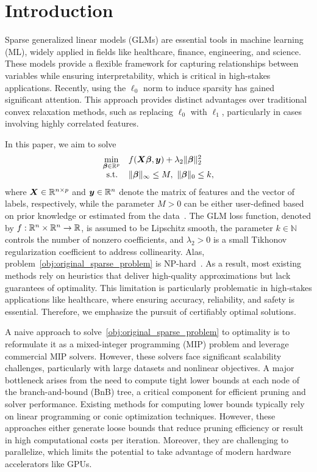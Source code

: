 \section{Introduction}

Sparse generalized linear models (GLMs) are essential tools in machine learning (ML), widely applied in fields like healthcare, finance, engineering, and science. 
These models provide a flexible framework for capturing relationships between variables while ensuring interpretability, which is critical in high-stakes applications.
Recently, using the $\ell_0$ norm to induce sparsity has gained significant attention. This approach provides distinct advantages over traditional convex relaxation methods, such as replacing $\ell_0$ with $\ell_1$, particularly in cases involving highly correlated features.

In this paper, we aim to solve
\begin{align} \label{obj:original_sparse_problem}
    \begin{array}{cl}
        \min\limits_{\bm{\beta} \in \mathbb{R}^p} & f(\bm{X} \bm{\beta}, \bm{y}) + \lambda_2 \lVert \bm{\beta} \rVert_2^2 \\
        \operatorname{s.\!t.\!} & \| \bm{\beta} \|_\infty \leq M, ~ \lVert \bm{\beta} \rVert_0 \leq k,
    \end{array}
\end{align}
where $\bm{X} \in \mathbb{R}^{n \times p}$ and $\bm{y} \in \mathbb{R}^n$ denote the matrix of features and the vector of labels, respectively, while the parameter $M > 0$ can be either user-defined based on prior knowledge or estimated from the data~\citep{park2020subset}. The GLM loss function, denoted by $f : \mathbb{R}^n \times \mathbb{R}^n \to \mathbb{R}$, is assumed to be Lipschitz smooth, the parameter $k \in \mathbb N$ controls the number of nonzero coefficients, and $\lambda_2 > 0$ is a small Tikhonov regularization coefficient to address collinearity.
Alas, problem~\eqref{obj:original_sparse_problem} is NP-hard~\citep{natarajan1995sparse}. 
As a result, most existing methods rely on heuristics that deliver high-quality approximations but lack guarantees of optimality. 
This limitation is particularly problematic in high-stakes applications like healthcare, where ensuring accuracy, reliability, and safety is essential. 
Therefore, we emphasize the pursuit of certifiably optimal solutions.

A naive approach to solve~\eqref{obj:original_sparse_problem} to optimality is to reformulate it as a mixed-integer programming (MIP) problem and leverage commercial MIP solvers.
However, these solvers face significant scalability challenges, particularly with large datasets and nonlinear objectives. 
A major bottleneck arises from the need to compute tight lower bounds at each node of the branch-and-bound (BnB) tree, a critical component for efficient pruning and solver performance.
Existing methods for computing lower bounds typically rely on linear programming or conic optimization techniques.
However, these approaches either generate loose bounds that reduce pruning efficiency or result in high computational costs per iteration. 
Moreover, they are challenging to parallelize, which limits the potential to take advantage of modern hardware accelerators like GPUs.

